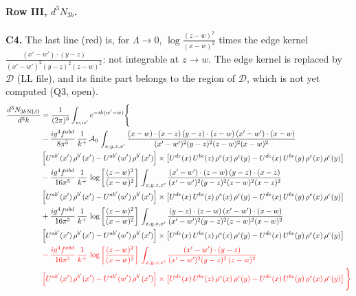 \documentclass[10pt]{article}
\numberwithin{equation}{section}
\newcommand{\old}[1]{{\color{red}#1}}
\newcommand{\rc}{\color{red}}
\begin{document}
\paragraph{Row III, $d^3N_{3b}$.}
\textbf{C4.} The last line (\old{red}) is, for $\Lambda\to0$, $\log\frac{(z-w)^2}{(x-w)^2}$ times the edge kernel $\frac{(x'-w')\cdot(y-z)}{(x'-w')^2(y-z)^2(z-w)^2}$: not integrable at $z\to w$. The edge kernel is replaced by $\mathcal D$ (LL file), and its finite part belongs to the region of $\mathcal D$, which is not yet computed (Q3, open).
\begin{align}
\frac{d^{3}N_{3b\,\rm NLO}}{d^{3}k} & = \frac{1}{(2\pi)^{3}}\int_{w,w'}e^{-ik(w'-w)}\Bigg\{\notag \\
&-\frac{ig^{4}f^{abd}}{8\pi^{5}}\,\frac{1}{k^{+}}\,\mathcal{A}_{0}\,\int_{x,y,z,x'}
\frac{(x-w)\cdot(x-z)\,(y-z)\cdot(z-w)\,(x'-w')\cdot(x-w)}{(x'-w')^{2}(y-z)^{2}(z-w)^{2}(x-w)^{2}}\notag \\ & \left[U^{ab'}(x')\,\rho^{b'}(x')-U^{ab'}(w')\, \rho^{b'}(x')\right]\times \left[U^{de}(x)\,U^{bc}(z)\, \rho^{e}(x)\,\rho^{c}(y)-U^{de}(x)\,U^{bc}(y)\,\rho^{e}(x)\,\rho^{c}(y)\right] \notag \\
& -\frac{ig^{4}f^{abd}}{16\pi^{5}}\,\frac{1}{k^{+}}\,\log{\left[\frac{(z-w)^{2}}{(x-w)^{2}}\right]}\,\int_{x,y,z,x'}
\frac{(x'-w')\cdot(z-w)\,(y-z)\cdot(x-z)}{(x'-w')^{2}(y-z)^{2}(z-w)^{2}(x-z)^{2}}\notag \\
&\left[U^{ab'}(x')\,\rho^{b'}(x')-U^{ab'}(w')\, \rho^{b'}(x')\right]\times \left[U^{de}(x)\,U^{bc}(z)\, \rho^{e}(x)\,\rho^{c}(y)-U^{de}(x)\,U^{bc}(y)\,\rho^{e}(x)\,\rho^{c}(y)\right] \notag \\
&+ \frac{ig^{4}f^{abd}}{16\pi^{5}}\,\frac{1}{k^{+}}\,\log{\left[\frac{(z-w)^{2}}{(x-w)^{2}}\right]}\,\int_{x,y,z,x'}
\frac{(y-z)\cdot(z-w)\,(x'-w')\cdot(x-w)}{(x'-w')^{2}(y-z)^{2}(z-w)^{2}(x-w)^{2}}\notag \\ 
& \left[U^{ab'}(x')\,\rho^{b'}(x')-U^{ab'}(w')\, \rho^{b'}(x')\right]\times \left[U^{de}(x)\,U^{bc}(z)\, \rho^{e}(x)\,\rho^{c}(y)-U^{de}(x)\,U^{bc}(y)\,\rho^{e}(x)\,\rho^{c}(y)\right] \notag \\
& \rc  -\frac{ig^{4}f^{abd}}{16\pi^{5}}\,\frac{1}{k^{+}}\,\log{\left[\frac{(z-w)^{2}}{(x-w)^{2}}\right]}\,\int_{x,y,z,x'}
\frac{(x'-w')\cdot(y-z)}{(x'-w')^{2}(y-z)^{2}\,(z-w)^{2}}\notag \\ & \rc  \left[U^{ab'}(x')\,\rho^{b'}(x')-U^{ab'}(w')\, \rho^{b'}(x')\right]\times \left[U^{de}(x)\,U^{bc}(z)\, \rho^{e}(x)\,\rho^{c}(y)-U^{de}(x)\,U^{bc}(y)\,\rho^{e}(x)\,\rho^{c}(y)\right]\Bigg\} \label{eq:F:G1IIIN3b}
\end{align}
\end{document}
